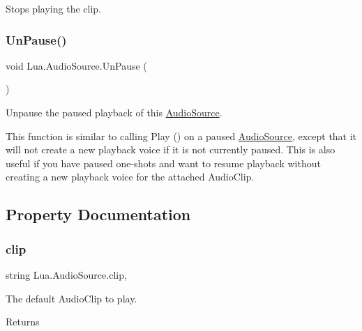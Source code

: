 Stops playing the clip. 

\mbox{\label{class_lua_1_1_audio_source_a3bbbde9384f38a43f97e48cd162b0dac}} 
\subsubsection{\texorpdfstring{UnPause()}{UnPause()}}
{\footnotesize\ttfamily void Lua.\+Audio\+Source.\+Un\+Pause (\begin{DoxyParamCaption}{ }\end{DoxyParamCaption})}



Unpause the paused playback of this \mbox{\hyperlink{class_lua_1_1_audio_source}{Audio\+Source}}. 

This function is similar to calling Play () on a paused \mbox{\hyperlink{class_lua_1_1_audio_source}{Audio\+Source}}, except that it will not create a new playback voice if it is not currently paused. This is also useful if you have paused one-\/shots and want to resume playback without creating a new playback voice for the attached Audio\+Clip. 

\subsection{Property Documentation}
\mbox{\label{class_lua_1_1_audio_source_a4913b6f1fa8dfe5eb528cd7e40f91684}} 
\subsubsection{\texorpdfstring{clip}{clip}}
{\footnotesize\ttfamily string Lua.\+Audio\+Source.\+clip\hspace{0.3cm}{\ttfamily [get]}, {\ttfamily [set]}}



The default Audio\+Clip to play. 

\begin{DoxyReturn}{Returns}

\end{DoxyReturn}
\mbox{\label{class_lua_1_1_audio_source_aaef47740090cbe41ff5b4f4b40aad7b7}} 
